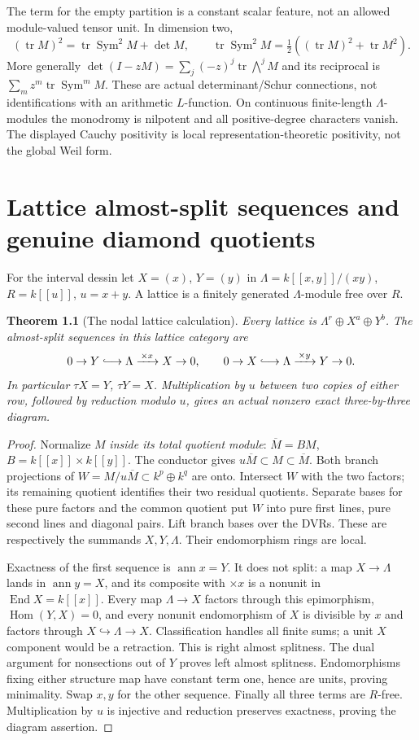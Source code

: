 \documentclass[11pt,oneside,openany]{book}
\newtheorem{theorem}{Theorem}[chapter]
\theoremstyle{definition}\newtheorem{definition}[theorem]{Definition}
\theoremstyle{remark}\newtheorem{remark}[theorem]{Remark}
\DeclareMathOperator{\tr}{tr}\DeclareMathOperator{\Rea}{Re}
\begin{document}
The term for the empty partition is a constant scalar feature, not an allowed module-valued tensor unit. In dimension two,
\[
 (\tr M)^2=\tr\operatorname{Sym}^2M+\det M,\qquad
 \tr\operatorname{Sym}^2M=\tfrac12((\tr M)^2+\tr M^2).
\]
More generally $\det(I-zM)=\sum_j(-z)^j\tr\bigwedge^jM$ and its reciprocal is $\sum_m z^m\tr\operatorname{Sym}^mM$. These are actual determinant/Schur connections, not identifications with an arithmetic $L$-function. On continuous finite-length $\Lambda$-modules the monodromy is nilpotent and all positive-degree characters vanish. The displayed Cauchy positivity is local representation-theoretic positivity, not the global Weil form.


\chapter{Lattice almost-split sequences and genuine diamond quotients}
For the interval dessin let $X=(x)$, $Y=(y)$ in $\Lambda=k[[x,y]]/(xy)$, $R=k[[u]]$, $u=x+y$. A lattice is a finitely generated $\Lambda$-module free over $R$.
\begin{theorem}[The nodal lattice calculation]\label{thm:nodear}
Every lattice is $\Lambda^r\oplus X^a\oplus Y^b$. The almost-split sequences in this lattice category are
\[
 0\to Y\lhook\joinrel\longrightarrow\Lambda\xrightarrow{\,\times x\,}X\to0,
 \qquad0\to X\lhook\joinrel\longrightarrow\Lambda\xrightarrow{\,\times y\,}Y\to0.
\]
In particular $\tau X=Y$, $\tau Y=X$. Multiplication by $u$ between two copies of either row, followed by reduction modulo $u$, gives an actual nonzero exact three-by-three diagram.
\end{theorem}
\begin{proof}
Normalize $M$ \emph{inside its total quotient module}: $\overline M=BM$, $B=k[[x]]\times k[[y]]$. The conductor gives $u\overline M\subset M\subset\overline M$. Both branch projections of $W=M/u\overline M\subset k^p\oplus k^q$ are onto. Intersect $W$ with the two factors; its remaining quotient identifies their two residual quotients. Separate bases for these pure factors and the common quotient put $W$ into pure first lines, pure second lines and diagonal pairs. Lift branch bases over the DVRs. These are respectively the summands $X,Y,\Lambda$. Their endomorphism rings are local.

Exactness of the first sequence is $\operatorname{ann}x=Y$. It does not split: a map $X\to\Lambda$ lands in $\operatorname{ann}y=X$, and its composite with $\times x$ is a nonunit in $\operatorname{End}X=k[[x]]$. Every map $\Lambda\to X$ factors through this epimorphism, $\operatorname{Hom}(Y,X)=0$, and every nonunit endomorphism of $X$ is divisible by $x$ and factors through $X\hookrightarrow\Lambda\to X$. Classification handles all finite sums; a unit $X$ component would be a retraction. This is right almost splitness. The dual argument for nonsections out of $Y$ proves left almost splitness. Endomorphisms fixing either structure map have constant term one, hence are units, proving minimality. Swap $x,y$ for the other sequence. Finally all three terms are $R$-free. Multiplication by $u$ is injective and reduction preserves exactness, proving the diagram assertion.
\end{proof}
\end{document}
